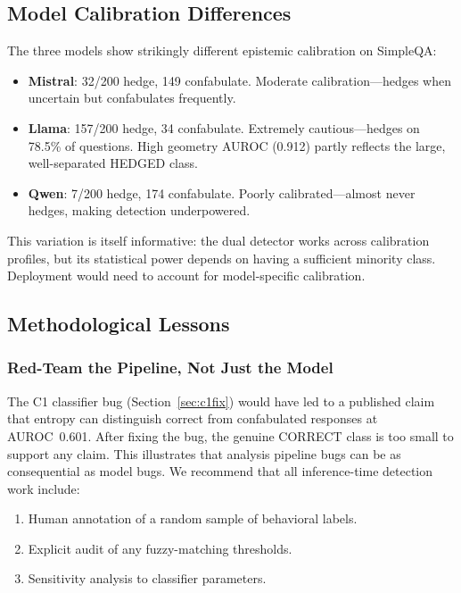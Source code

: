 \documentclass[11pt,a4paper]{article}
\begin{document}
\subsection{Model Calibration Differences}

The three models show strikingly different epistemic calibration on SimpleQA:

\begin{itemize}[nosep]
    \item \textbf{Mistral}: 32/200 hedge, 149 confabulate. Moderate calibration---hedges when uncertain but confabulates frequently.
    \item \textbf{Llama}: 157/200 hedge, 34 confabulate. Extremely cautious---hedges on 78.5\% of questions. High geometry AUROC (0.912) partly reflects the large, well-separated HEDGED class.
    \item \textbf{Qwen}: 7/200 hedge, 174 confabulate. Poorly calibrated---almost never hedges, making detection underpowered.
\end{itemize}

This variation is itself informative: the dual detector works across calibration profiles, but its statistical power depends on having a sufficient minority class. Deployment would need to account for model-specific calibration.

\subsection{Methodological Lessons}

\subsubsection{Red-Team the Pipeline, Not Just the Model}

The C1 classifier bug (Section~\ref{sec:c1fix}) would have led to a published claim that entropy can distinguish correct from confabulated responses at AUROC~0.601. After fixing the bug, the genuine CORRECT class is too small to support any claim. This illustrates that analysis pipeline bugs can be as consequential as model bugs. We recommend that all inference-time detection work include:
\begin{enumerate}[nosep]
    \item Human annotation of a random sample of behavioral labels.
    \item Explicit audit of any fuzzy-matching thresholds.
    \item Sensitivity analysis to classifier parameters.
\end{enumerate}
\end{document}

